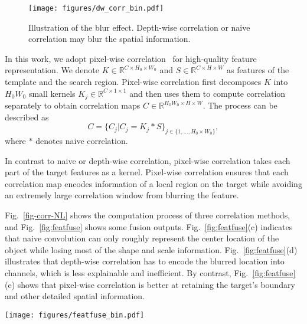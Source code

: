 \documentclass[final]{cvpr}
\begin{document}
\begin{figure}
\centering
    \texttt{[image: figures/dw\_corr\_bin.pdf]}
    \caption{Illustration of the blur effect. Depth-wise correlation or naive correlation may blur the spatial information.} \label{fig:dwcorr_blur}
    \vspace{-3mm}
\end{figure}

In this work, we adopt pixel-wise correlation~\cite{RANet} for high-quality feature representation. 
We denote $K \in {\mathbb{R}^{C \times {H_0} \times {W_0}}}$ and $S \in {\mathbb{R}^{C \times H \times W}}$ 
as features of the template and the search region. 
Pixel-wise correlation first decomposes $K$ into ${H_0}{W_0}$ small kernels 
${K_j} \in {\mathbb{R}^{C \times {1} \times {1}}}$ and then uses them to compute correlation 
separately to obtain correlation maps $C \in {\mathbb{R}^{{H_0}{W_0} \times H \times W}}$. 
The process can be described as
\begin{equation}
C = {\{ {C_j}|{C_j} = {K_j}*S\} _{j \in \{ 1,...,{H_0} \times {W_0}\} }},
\end{equation}
where $*$ denotes naive correlation.

In contrast to naive or depth-wise correlation, pixel-wise correlation takes each part of the target features as a kernel. 
Pixel-wise correlation ensures that each correlation map encodes information of a local region on the target 
while avoiding an extremely large correlation window from blurring the feature. 

Fig.~\ref{fig-corr-NL} shows the computation process of three correlation methods, 
and Fig.~\ref{fig:featfuse} shows some fusion outputs.
Fig.~\ref{fig:featfuse}(c) indicates that naive convolution can only roughly represent the center location 
of the object while losing most of the shape and scale information. 
Fig.~\ref{fig:featfuse}(d) illustrates that depth-wise correlation has to encode the blurred location into channels, 
which is less explainable and inefficient. 
By contrast, Fig.~\ref{fig:featfuse}(e) shows that pixel-wise correlation is better at retaining the target's 
boundary and other detailed spatial information. 

\begin{figure*}
    \texttt{[image: figures/featfuse\_bin.pdf]}
    \caption{Comparison among different correlation responses. (a) and (b) denote the reference branch and 
    the test branch, respectively. (c), (d), and (e) are correlation result of naive, depth-wise (the first 32 channels of 256), and pixel-wise correlations, respectively.} \label{fig:featfuse}
\end{figure*}
\end{document}
